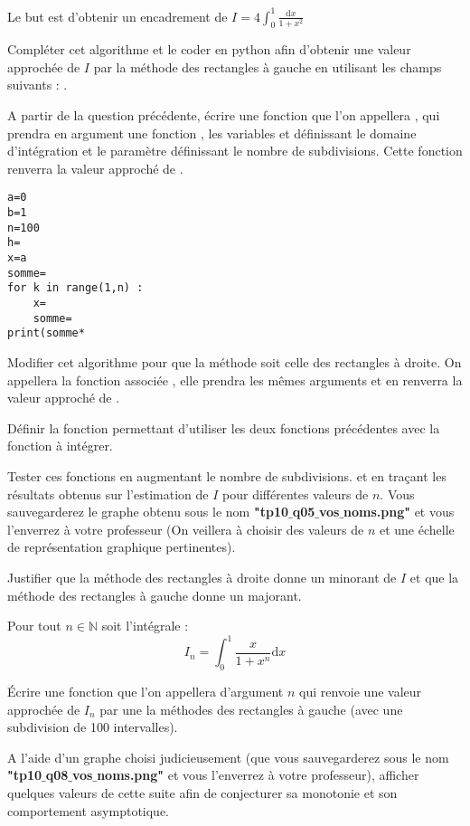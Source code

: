 Le but est d'obtenir un encadrement de
\quad $\displaystyle I=4\int_0^1\frac{\text{d}x}{1+x^2}$

\begin{minipage}[c]{.5\linewidth}
\question{}
Compléter cet algorithme et le coder en python afin d'obtenir une valeur approchée de $I$ par la méthode des rectangles à gauche en utilisant les champs suivants : 
.

\question{} A partir de la question précédente, écrire une fonction que l'on appellera , qui prendra en argument une fonction , les variables  et  définissant le domaine d'intégration et le paramètre  définissant le nombre de subdivisions. Cette fonction renverra la valeur approché de .
\end{minipage} \hfill
\begin{minipage}[r]{.35\linewidth}
\begin{lstlisting}
a=0
b=1
n=100
h=
x=a
somme=
for k in range(1,n) :
    x=
    somme=
print(somme*
\end{lstlisting}
\end{minipage}

\question{}
Modifier cet algorithme pour que la méthode soit celle des rectangles à droite. On appellera la fonction associée , elle prendra les mêmes arguments et en renverra la valeur approché de .

\question{} Définir la fonction  permettant d'utiliser les deux fonctions précédentes avec la fonction à intégrer. 


\question{}
Tester ces fonctions en augmentant le nombre de subdivisions. et en traçant les résultats obtenus sur l'estimation de $I$ pour différentes valeurs de $n$. Vous sauvegarderez le graphe obtenu sous le nom \textbf{"tp10$\_$q05$\_$vos$\_$noms.png"} et vous l'enverrez à votre professeur (On veillera à choisir des valeurs de $n$ et une échelle de représentation graphique pertinentes).



\question{}
Justifier que la méthode des rectangles à droite donne un minorant de $I$ et que la méthode des rectangles à gauche donne un majorant. 

Pour tout $n\in\mathbb{N}$ soit l'intégrale : 
$$I_n=\int_0^1\frac{x}{1+x^n} \text{d}x$$

\question{} Écrire une fonction que l'on appellera  d'argument $n$ qui renvoie une valeur approchée de $I_n$ par une la méthodes des rectangles à gauche (avec une subdivision de 100 intervalles).

\question{} A l'aide d'un graphe choisi judicieusement (que vous sauvegarderez sous le nom \textbf{"tp10$\_$q08$\_$vos$\_$noms.png"} et vous l'enverrez à votre professeur), afficher quelques valeurs de cette suite afin de conjecturer sa monotonie et son comportement asymptotique.